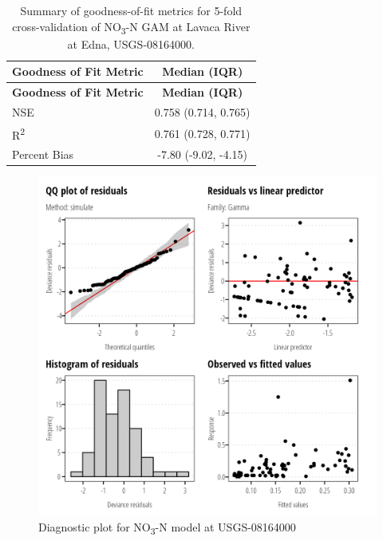 \documentclass[
]{article}
\begin{document}
\hypertarget{tbl-NO308164000-CV}{}
\begin{longtable}[]{@{}lc@{}}
\caption{\label{tbl-NO308164000-CV}Summary of goodness-of-fit metrics
for 5-fold cross-validation of NO\textsubscript{3}-N GAM at Lavaca River
at Edna, USGS-08164000.}\tabularnewline
\toprule()
\textbf{Goodness of Fit Metric} & \textbf{Median (IQR)} \\
\midrule()
\endfirsthead
\toprule()
\textbf{Goodness of Fit Metric} & \textbf{Median (IQR)} \\
\midrule()
\endhead
NSE & 0.758 (0.714, 0.765) \\
R\textsuperscript{2} & 0.761 (0.728, 0.771) \\
Percent Bias & -7.80 (-9.02, -4.15) \\
\bottomrule()
\end{longtable}

\clearpage

\begin{figure}[h]

{\centering \includegraphics{model_assessment_files/figure-pdf/unnamed-chunk-4-1.png}

}

\caption{Diagnostic plot for NO\textsubscript{3}-N model at
USGS-08164000}

\end{figure}
\end{document}
